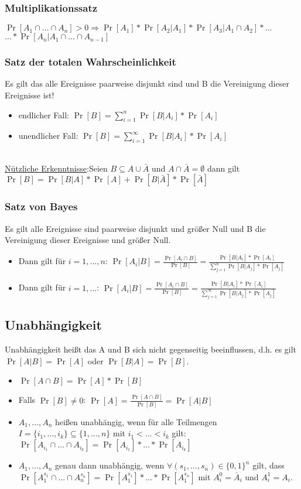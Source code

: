 \subsubsection{Multiplikationssatz}
$\Pr[A_1\cap\ldots\cap A_n]>0\Rightarrow\Pr[A_1]*\Pr[A_2|A_1]*\Pr[A_3|A_1\cap A_2]*\ldots$\\
$\dots*\Pr[A_n|A_1\cap\ldots\cap A_{n-1}]$

\subsubsection{Satz der totalen Wahrscheinlichkeit}
Es gilt das alle Ereignisse paarweise disjunkt sind und B die Vereinigung dieser Ereignisse ist!
\begin{itemize}
\item endlicher Fall: $\Pr[B]=\sum_{i=1}^n\Pr[B|A_i]*\Pr[A_i]$
\item unendlicher Fall: $\Pr[B]=\sum_{i=1}^\infty\Pr[B|A_i]*\Pr[A_i]$
\end{itemize}
\\
\underline{Nützliche Erkenntnisse}:Seien $B\subseteq A\cup\bar A$ und $A\cap\bar A =\emptyset$ dann gilt $\Pr[B]=\Pr[B|A]*\Pr[A]+\Pr[B|\bar A]*\Pr[\bar A]$

\subsubsection{Satz von Bayes}
Es gilt alle Ereignisse sind paarweise disjunkt und größer Null und B die Vereinigung dieser Ereignisse und größer Null.
\begin{itemize}
\item Dann gilt für $i=1,\ldots,n$: $\Pr[A_i|B]=\frac{\Pr[A_i\cap B]}{\Pr[B]}=\frac{\Pr[B|A_i]*\Pr[A_i]}{\sum^n_{j=1}\Pr[B|A_j]*\Pr[A_j]}$
\item Dann gilt für $i=1,\ldots$: $\Pr[A_i|B]=\frac{\Pr[A_i\cap B]}{\Pr[B]}=\frac{\Pr[B|A_i]*\Pr[A_i]}{\sum^\infty_{j=1}\Pr[B|A_j]*\Pr[A_j]}$
\end{itemize}

\subsection{Unabhängigkeit}
Unabhängigkeit heißt das A und B sich nicht gegenseitig beeinflussen, d.h. es gilt $\Pr[A|B]=\Pr[A]$ oder $\Pr[B|A]=\Pr[B]$.

\begin{itemize}
\item $\Pr[A\cap B]=\Pr[A]*\Pr[B]$
\item Falls $\Pr[B]\neq0$: $\Pr[A]=\frac{\Pr[A\cap B]}{\Pr[B]}=\Pr[A|B]$
\item $A_1,\ldots,A_n$ heißen unabhängig, wenn für alle Teilmengen $I = \{ i_1,\ldots, i_k\}\subseteq\{1,\ldots,n\}$ mit $i_1<\ldots<i_k$ gilt:\\
	$\Pr[A_{i_1}\cap\ldots\cap A_{i_k}]=\Pr[A_{i_1}]*\ldots*\Pr[A_{i_k}]$
\item $A_1,\ldots,A_n$ genau dann unabhängig, wenn $\forall (s_1,\ldots,s_n)\in\{0,1\}^n$ gilt, dass\\
	$\Pr[A_1^{s_1}\cap\ldots\cap A_n^{s_n}]=\Pr[A_1^{s_1}]*\ldots*\Pr[A_1^{s_n}]$ mit $A_i^0=\bar A_i$ und $A_i^1=A_i$.
\end{itemize}

